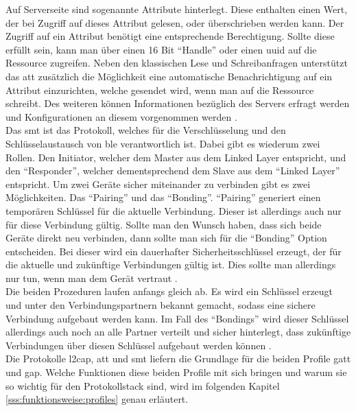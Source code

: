 \noindent Auf Serverseite sind sogenannte Attribute hinterlegt. Diese enthalten einen Wert, der bei Zugriff auf dieses Attribut gelesen, oder überschrieben werden kann. Der Zugriff auf ein Attribut benötigt eine entsprechende Berechtigung. Sollte diese erfüllt sein, kann man über einen 16 Bit "`Handle"' oder einen \ac{uuid} auf die Ressource zugreifen. Neben den klassischen Lese und Schreibanfragen unterstützt das \ac{att} zusätzlich die Möglichkeit eine automatische Benachrichtigung auf ein Attribut einzurichten, welche gesendet wird, wenn man auf die Ressource schreibt. Des weiteren können Informationen bezüglich des Servers erfragt werden und Konfigurationen an diesem vorgenommen werden \cite[Seite 26ff]{Townsend14:GSB}.\\

\noindent Das \ac{smt} ist das Protokoll, welches für die Verschlüsselung und den Schlüsselaustausch von \ac{ble} verantwortlich ist. Dabei gibt es wiederum zwei Rollen. Den Initiator, welcher dem Master aus dem Linked Layer entspricht, und den "`Responder"', welcher dementsprechend dem Slave aus dem "`Linked Layer"' entspricht. Um zwei Geräte sicher miteinander zu verbinden gibt es zwei Möglichkeiten. Das "`Pairing"' und das "`Bonding"'. "`Pairing"' generiert einen temporären Schlüssel für die aktuelle Verbindung. Dieser ist allerdings auch nur für diese Verbindung gültig. Sollte man den Wunsch haben, dass sich beide Geräte direkt neu verbinden, dann sollte man sich für die "`Bonding"' Option entscheiden. Bei dieser wird ein dauerhafter Sicherheitsschlüssel erzeugt, der für die aktuelle und zukünftige Verbindungen gültig ist. Dies sollte man allerdings nur tun, wenn man dem Gerät vertraut \cite[Seite 28]{Townsend14:GSB}.\\

\noindent Die beiden Prozeduren laufen anfangs gleich ab. Es wird ein Schlüssel erzeugt und unter den Verbindungspartnern bekannt gemacht, sodass eine sichere Verbindung aufgebaut werden kann. Im Fall des "`Bondings"' wird dieser Schlüssel allerdings auch noch an alle Partner verteilt und sicher hinterlegt, dass zukünftige Verbindungen über diesen Schlüssel aufgebaut werden können \cite[Seite 29]{Townsend14:GSB}.\\ 

\noindent Die Protokolle \ac{l2cap}, \ac{att} und \ac{smt} liefern die Grundlage für die beiden Profile \ac{gatt} und \ac{gap}. Welche Funktionen diese beiden Profile mit sich bringen und warum sie so wichtig für den Protokollstack sind, wird im folgenden Kapitel \ref{sss:funktionsweise:profiles} genau erläutert.\\

